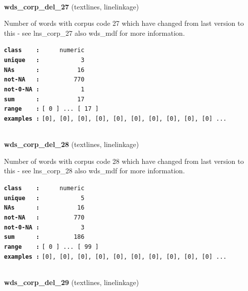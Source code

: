 \documentclass[]{article}
\begin{document}
~

\textbf{wds\_corp\_del\_27} (textlines, linelinkage)

Number of words with corpus code 27 which have changed from last version
to this - see lns\_corp\_27 also wds\_mdf for more information.

\textbf{\texttt{class\ \ \ \ :}} \texttt{~~~~~numeric}\\
\textbf{\texttt{unique\ \ \ :}} \texttt{~~~~~~~~~~~3}\\
\textbf{\texttt{NAs\ \ \ \ \ \ :}} \texttt{~~~~~~~~~~16}\\
\textbf{\texttt{not-NA\ \ \ :}} \texttt{~~~~~~~~~770}\\
\textbf{\texttt{not-0-NA\ :}} \texttt{~~~~~~~~~~~1}\\
\textbf{\texttt{sum\ \ \ \ \ \ :}} \texttt{~~~~~~~~~~17}\\
\textbf{\texttt{range\ \ \ \ :}}
\texttt{{[}\ 0\ {]}\ ...\ {[}\ 17\ {]}}\\
\textbf{\texttt{examples\ :}}
\texttt{{[}0{]},\ {[}0{]},\ {[}0{]},\ {[}0{]},\ {[}0{]},\ {[}0{]},\ {[}0{]},\ {[}0{]},\ {[}0{]},\ {[}0{]}\ ...}\\

~

\textbf{wds\_corp\_del\_28} (textlines, linelinkage)

Number of words with corpus code 28 which have changed from last version
to this - see lns\_corp\_28 also wds\_mdf for more information.

\textbf{\texttt{class\ \ \ \ :}} \texttt{~~~~~numeric}\\
\textbf{\texttt{unique\ \ \ :}} \texttt{~~~~~~~~~~~5}\\
\textbf{\texttt{NAs\ \ \ \ \ \ :}} \texttt{~~~~~~~~~~16}\\
\textbf{\texttt{not-NA\ \ \ :}} \texttt{~~~~~~~~~770}\\
\textbf{\texttt{not-0-NA\ :}} \texttt{~~~~~~~~~~~3}\\
\textbf{\texttt{sum\ \ \ \ \ \ :}} \texttt{~~~~~~~~~186}\\
\textbf{\texttt{range\ \ \ \ :}}
\texttt{{[}\ 0\ {]}\ ...\ {[}\ 99\ {]}}\\
\textbf{\texttt{examples\ :}}
\texttt{{[}0{]},\ {[}0{]},\ {[}0{]},\ {[}0{]},\ {[}0{]},\ {[}0{]},\ {[}0{]},\ {[}0{]},\ {[}0{]},\ {[}0{]}\ ...}\\

~

\textbf{wds\_corp\_del\_29} (textlines, linelinkage)
\end{document}
